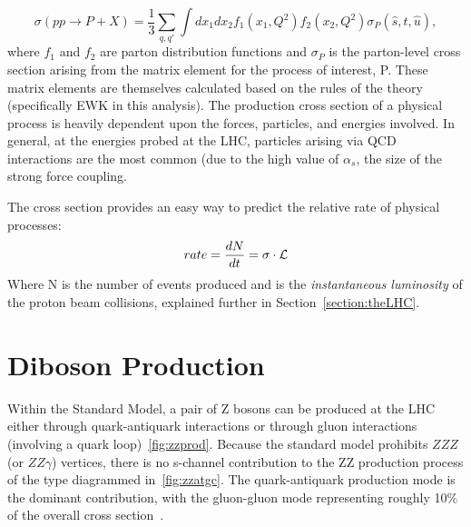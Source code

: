 \begin{equation}
    \sigma(pp \rightarrow P + X) = \frac{1}{3} \sum\limits_{q,q'} \int dx_1 dx_2
    f_1(x_1, Q^2) f_2(x_2, Q^2) \sigma_P(\hat s, \hat t, \hat u),
\end{equation}
where $f_1$ and $f_2$ are parton distribution functions and $\sigma_P$ is the
parton-level cross section arising from the matrix element for the process of
interest, P. These matrix elements are themselves calculated based on the rules
of the theory (specifically EWK in this analysis).  The production cross section
of a physical process is heavily dependent upon the forces, particles, and
energies involved. In general, at the energies probed at the LHC, particles
arising via QCD interactions are the most common (due to the high value of
\emph{$\alpha_{s}$}, the size of the strong force coupling.

The cross section provides an easy way to predict the relative rate of physical
processes:
\begin{equation}
    rate = \frac{dN}{dt} = \sigma \cdot \mathcal{L}
\end{equation}
Where N is the number of events produced and \instlum is the \emph{instantaneous
luminosity} of the proton beam collisions, explained further
in Section~\ref{section:theLHC}.


\section{Diboson Production} 
Within the Standard Model, a pair of Z bosons can be produced at the LHC either
through quark-antiquark interactions or through gluon interactions (involving a
quark loop)~\ref{fig:zzprod}. Because the standard model prohibits $ZZZ$ (or
$ZZ\gamma$) vertices, %
there is no s-channel contribution to the ZZ production
process of the type diagrammed in~\ref{fig:zzatgc}. The quark-antiquark
production mode is the dominant contribution, with the gluon-gluon mode
representing roughly 10\% of the overall cross section~\cite{Campbell:2011jv}.

